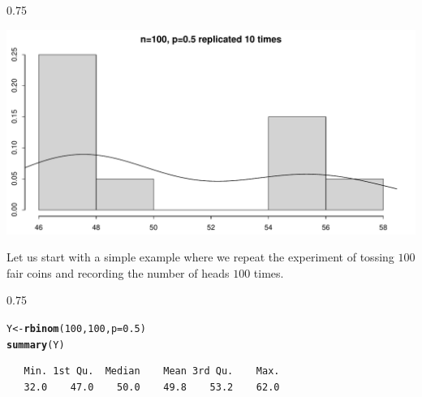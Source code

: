 \documentclass{beamer}\usepackage[]{graphicx}\usepackage[]{color}
\makeatletter
\newcommand{\hlnum}[1]{\textcolor[rgb]{0.2,0.2,0.2}{#1}}%
\newcommand{\hlstd}[1]{\textcolor[rgb]{0.102,0.102,0.102}{#1}}%
\newcommand{\hlkwb}[1]{\textcolor[rgb]{0.102,0.102,0.102}{#1}}%
\newcommand{\hlkwc}[1]{\textcolor[rgb]{0.2,0.2,0.2}{#1}}%
\newcommand{\hlkwd}[1]{\textcolor[rgb]{0.102,0.102,0.102}{\textbf{#1}}}%
\newenvironment{kframe}{%
 \def\at@end@of@kframe{}%
 \ifinner\ifhmode%
  \def\at@end@of@kframe{\end{minipage}}%
  \begin{minipage}{\columnwidth}%
 \fi\fi%
 \def\FrameCommand##1{\hskip\@totalleftmargin \hskip-\fboxsep
 \colorbox{shadecolor}{##1}\hskip-\fboxsep
     \hskip-\linewidth \hskip-\@totalleftmargin \hskip\columnwidth}%
 \MakeFramed {\advance\hsize-\width
   \@totalleftmargin\z@ \linewidth\hsize
   \@setminipage}}%
 {\par\unskip\endMakeFramed%
 \at@end@of@kframe}
\newenvironment{knitrout}{}{} %
\renewenvironment{knitrout}{\begin{spacing}{0.75}\begin{tiny}}{\end{tiny}\end{spacing}}
\makeatother
\begin{document}
\begin{frame}[fragile]

\begin{knitrout}\small
{}\color{fgcolor}

{\centering \includegraphics[width=0.89\linewidth]{figure/graphics-unnamed-chunk-3-1} 

}



\end{knitrout}

\end{frame}

\begin{frame}[fragile]

Let us start with a simple example where we repeat the experiment of tossing
$100$ fair coins and recording the number of heads $100$ times.

\begin{knitrout}\small
{}\color{fgcolor}\begin{kframe}
\begin{alltt}
\hlstd{Y} \hlkwb{<-} \hlkwd{rbinom}\hlstd{(}\hlnum{100}\hlstd{,} \hlnum{100}\hlstd{,} \hlkwc{p}\hlstd{=}\hlnum{0.5}\hlstd{)}
\hlkwd{summary}\hlstd{(Y)}
\end{alltt}
\begin{verbatim}
   Min. 1st Qu.  Median    Mean 3rd Qu.    Max. 
   32.0    47.0    50.0    49.8    53.2    62.0 
\end{verbatim}
\end{kframe}
\end{knitrout}

\end{frame}
\end{document}
